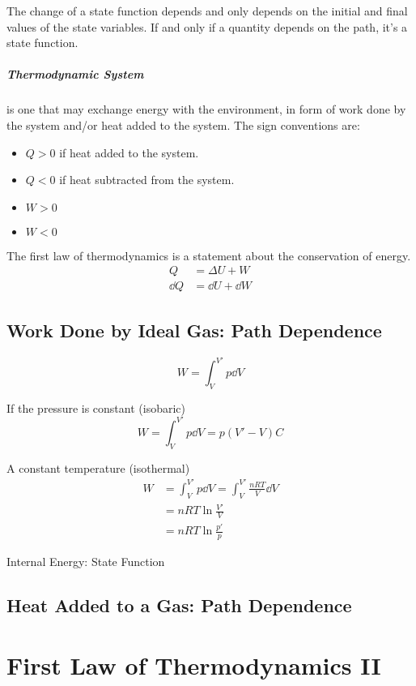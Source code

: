 \documentclass{note}
\begin{document}
The change of a state function depends and only depends on the initial and final values of the state variables. If and only if a quantity depends on the path, it's a state function.

\paragraph{Thermodynamic System} is one that may exchange energy with the environment, in form of work done by the system and/or heat added to the system. The sign conventions are:
\begin{itemize}
  \item \(Q > 0\) if heat added to the system.
  \item \(Q < 0\) if heat subtracted from the system.
  \item \(W > 0\)
  \item \(W < 0\)
\end{itemize}

The first law of thermodynamics is a statement about the conservation of energy.
\begin{align*}
  Q      & = \Delta U + W    \\
  \dd{Q} & = \dd{U} + \dd{W}
\end{align*}

\section{Work Done by Ideal Gas: Path Dependence}

\[
  W = \int_{V}^{V'} p\dd{V}
\]

If the pressure is constant (isobaric)
\[
  W = \int_{V}^{V'} p\dd{V} = p(V'-V)C
\]

A constant temperature (isothermal)
\begin{align*}
  W & = \int_{V}^{V'} p\dd{V} = \int_{V}^{V'} \frac{nRT}{V}\dd{V} \\
    & = nRT\ln\frac{V'}{V}                                        \\
    & = nRT\ln\frac{p'}{p}
\end{align*}

Internal Energy: State Function


\section{Heat Added to a Gas: Path Dependence}

\chapter{First Law of Thermodynamics II}
\end{document}
